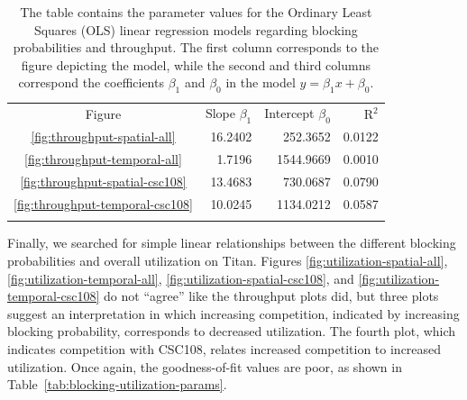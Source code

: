 \begin{table}
\caption{The table contains the parameter values for the Ordinary Least Squares
(OLS) linear regression models regarding blocking probabilities and throughput.
The first column corresponds to the figure depicting the model, while the
second and third columns correspond the coefficients $\beta_1$ and $\beta_0$ in
the model $y = \beta_{1}x + \beta_0$.}
\label{tab:blocking-throughput-params}       %
\begin{tabular}{crrr}
\hline\noalign{\smallskip}
Figure  & Slope $\beta_1$ & Intercept $\beta_0$     & $\text{R}^2$ \\
\noalign{\smallskip}\hline\noalign{\smallskip}
\ref{fig:throughput-spatial-all}     &  16.2402 &   252.3652    &   0.0122  \\
\ref{fig:throughput-temporal-all}    &   1.7196 &  1544.9669    &   0.0010  \\
\ref{fig:throughput-spatial-csc108}  &  13.4683 &   730.0687    &   0.0790  \\
\ref{fig:throughput-temporal-csc108} &  10.0245 &  1134.0212    &   0.0587  \\
\noalign{\smallskip}\hline
\end{tabular}
\end{table}


Finally, we searched for simple linear relationships between the different
blocking probabilities and overall utilization on Titan. Figures
\ref{fig:utilization-spatial-all}, \ref{fig:utilization-temporal-all},
\ref{fig:utilization-spatial-csc108}, and \ref{fig:utilization-temporal-csc108}
do not ``agree'' like the throughput plots did, but three plots suggest an
interpretation in which increasing competition, indicated by increasing
blocking probability, corresponds to decreased utilization. The fourth plot,
which indicates competition with CSC108, relates increased competition to
increased utilization. Once again, the goodness-of-fit values are poor, as
shown in Table~\ref{tab:blocking-utilization-params}.

